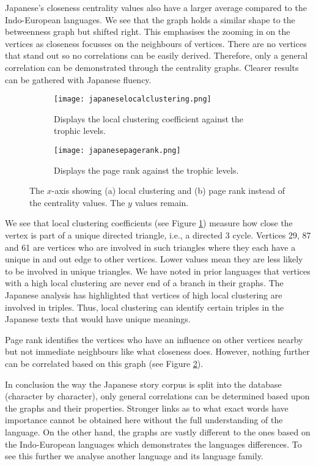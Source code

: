 Japanese's closeness centrality values also have a larger average compared to the Indo-European languages. We see that the graph holds a similar shape to the betweenness graph but shifted right. This emphasises the zooming in on the vertices as closeness focusses on the neighbours of vertices. There are no vertices that stand out so no correlations can be easily derived. Therefore, only a general correlation can be demonstrated through the centrality graphs. Clearer results can be gathered with Japanese fluency.

\begin{figure}[!htb]
\centering
\begin{subfigure}{.45\textwidth}
	\hspace{-1cm} 
	\texttt{[image: japaneselocalclustering.png]}
	\caption{Displays the local clustering coefficient against the trophic levels.}
	\label{fig:jplc}
\end{subfigure}
\hfill
\begin{subfigure}{.45\textwidth}
	\hspace{-1cm} 
	\texttt{[image: japanesepagerank.png]}
	\caption{Displays the page rank against the trophic levels.}
	\label{fig:jppr}
\end{subfigure}
\caption{The $x$-axis showing (a) local clustering and (b) page rank instead of the centrality values. The $y$ values remain.}
\label{fig:jpother}
\end{figure}

We see that local clustering coefficients (see Figure \ref{fig:jplc}) measure how close the vertex is part of a unique directed triangle, i.e., a directed 3 cycle. Vertices 29, 87 and 61 are vertices who are involved in such triangles where they each have a unique in and out edge to other vertices. Lower values mean they are less likely to be involved in unique triangles. We have noted in prior languages that vertices with a high local clustering are never end of a branch in their graphs. The Japanese analysis has highlighted that vertices of high local clustering are involved in triples. Thus, local clustering can identify certain triples in the Japanese texts that would have unique meanings.

Page rank identifies the vertices who have an influence on other vertices nearby but not immediate neighbours like what closeness does. However, nothing further can be correlated based on this graph (see Figure \ref{fig:jppr}).

In conclusion the way the Japanese story corpus is split into the database (character by character), only general correlations can be determined based upon the graphs and their properties. Stronger links as to what exact words have importance cannot be obtained here without the full understanding of the language. On the other hand, the graphs are vastly different to the ones based on the Indo-European languages which demonstrates the languages differences. To see this further we analyse another language and its language family.

